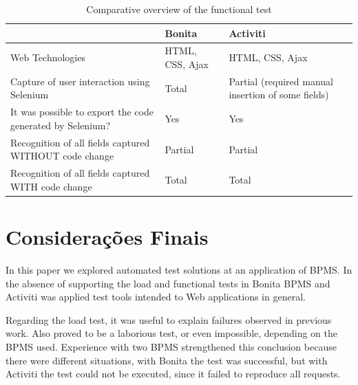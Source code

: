 \documentclass[runningheads,a4paper]{llncs}
\begin{document}
{\begin{table}
\begin{center}
{\scriptsize
\begin{tabular}{p{6cm}|l|p{4.5cm}}
\hline
 & Bonita & Activiti \\\hline
Web Technologies & HTML, CSS, Ajax & HTML, CSS, Ajax \\\hline
Capture of user interaction using Selenium & Total & Partial (required manual insertion of some fields) \\\hline
It was possible to export the code generated by Selenium? & Yes & Yes \\\hline
Recognition of all fields captured WITHOUT code change & Partial & Partial \\\hline
Recognition of all fields captured WITH code change & Total & Total \\\hline
\end{tabular}
}
\caption{Comparative overview of the functional test}
\label{tab:testeFuncional}
\end{center}
\end{table}


\section{Considerações Finais}\label{s:conclu}

In this paper we explored automated test solutions at an application of BPMS. In the absence of supporting the load and functional tests in Bonita BPMS and Activiti was applied test tools intended to Web applications in general.


Regarding the load test, it was useful to explain failures observed in previous work. Also proved to be a laborious test, or even impossible, depending on the BPMS used. Experience with two BPMS strengthened this conclusion because there were different situations, with Bonita the test was successful, but with Activiti the test could not be executed, since it failed to reproduce all requests. 


}
\end{document}
